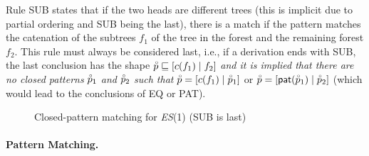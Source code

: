 Rule \textsf{SUB} states that if the two heads are different trees
(this is implicit due to partial ordering and \textsf{SUB} being the
last), there is a match if the pattern matches the catenation of the
subtrees \(f_1\) of the tree in the forest and the remaining forest
\(f_2\). This rule must always be considered last, i.e., if a
derivation ends with \textsf{SUB}, the last conclusion has the shape
\(\accentset{\circ}{p} \sqsubseteq [{c(f_1)}\mid{f_2}]\) \emph{and it is implied
that there are no closed patterns} \(\accentset{\circ}{p}_1\) \emph{and}
\(\accentset{\circ}{p}_2\) \emph{such that} \(\accentset{\circ}{p} =
[{c(f_1)}\mid{\accentset{\circ}{p}_1}]\) or \(\accentset{\circ}{p} =
[{\textsf{pat}(\accentset{\circ}{p}_1)}\mid{\accentset{\circ}{p}_2}]\) (which would lead to the
conclusions of \textsf{EQ} or \textsf{PAT}).
\begin{figure}[H]
\caption{Closed\hyp{}pattern matching for \textit{ES}(1)%
(\textsf{SUB} is last)
\label{es1_tree_matching_def}}
\end{figure}

\paragraph{Pattern Matching.}

